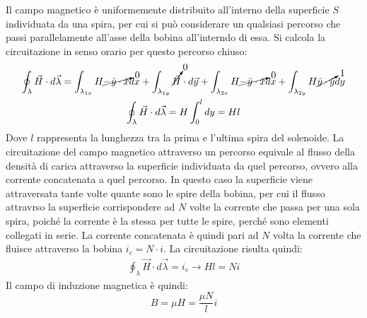 \documentclass{article}
\numberwithin{equation}{subsection}
\begin{document}
\begin{center}
\end{center}

Il campo magnetico è uniformemente distribuito all'interno della superficie $S$ individuata da una spira, per cui si può considerare un qualsiasi percorso che passi parallelamente 
all'asse della bobina all'interndo di essa. Si calcola la circuitazione in senso orario per questo percorso chiuso:
\begin{gather*}
    \displaystyle\oint_{\lambda}\vec{H}\cdot d\vec{\lambda}=\int_{\lambda_{1x}}H\cancelto{0}{-\hat{y}\cdot\hat{x}}dx+\int_{\lambda_{1y}}\cancelto{0}{\vec{H}}\cdot d\vec{y}+\int_{\lambda_{2x}}H\cancelto{0}{-\hat{y}\cdot\hat{x}}dx+\int_{\lambda_{2y}}H\cancelto{1}{\hat{y}\cdot\hat{y}}dy\\
    \displaystyle\oint_{\lambda}\vec{H}\cdot d\vec{\lambda}=H\int_0^ldy=Hl
\end{gather*}
Dove $l$ rappresenta la lunghezza tra la prima e l'ultima spira del solenoide. La circuitazione del campo magnetico attraverso un percorso equivale al 
flusso della densità di carica attraverso la superficie individuata da quel percorso, ovvero alla corrente concatenata a quel percorso. In questo caso la superficie 
viene attraversata tante volte quante sono le spire della bobina, per cui il flusso attravrso la superficie corrispondere ad $N$ volte la corrente che passa per una sola spira, 
poiché la corrente è la stessa per tutte le spire, perché sono elementi collegati in serie. La corrente concatenata è quindi pari ad $N$ volta la corrente che fluisce 
attraverso la bobina $i_c=N\cdot i$. La circuitazione risulta quindi:
\begin{gather*}
    \displaystyle\oint_{\lambda}\vec{H}\cdot d\vec{\lambda}=i_c\to Hl=Ni
\end{gather*}
Il campo di induzione magnetica è quindi:
\begin{equation*}
    B=\mu H=\displaystyle\frac{\mu N}{l}i
\end{equation*}
\end{document}
